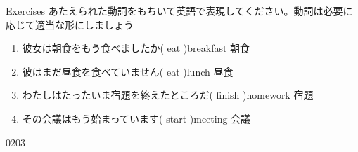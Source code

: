 \documentclass[aspectratio=169,xcolor={dvipsnames,table}]{beamer}
\newcommand{\myaudio}[1]{\href{#1}{\faVolumeUp}}
\begin{document}
\begin{frame}[plain]{Exercises}
 あたえられた動詞をもちいて英語で表現してください。動詞は必要に応じて適当な形にしましょう

\begin{enumerate}
 \item 彼女は朝食をもう食べましたか( eat )\hfill{\scriptsize breakfast  朝食}\\
 \item 彼はまだ昼食を食べていません( eat )\hfill{\scriptsize lunch  昼食}\\
 \item わたしはたったいま宿題を終えたところだ( finish )\hfill{\scriptsize homework  宿題}\\
 \item その会議はもう始まっています( start )\hfill{\scriptsize meeting  会議}\\
\end{enumerate}

\hfill{\scriptsize 0203}\,{\scriptsize \myaudio{./audio/014_have_pp_kekka_06.mp3}}

\end{frame}
\end{document}
